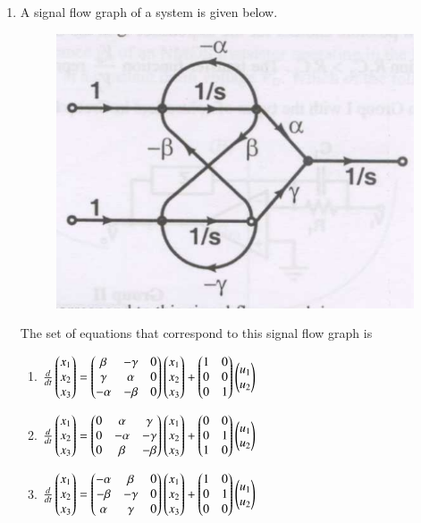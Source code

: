\documentclass[a4paper, 11pt]{article}
\begin{document}
\begin{enumerate}
    \item A signal flow graph of a system is given below.
    \begin{figure}[H]
        \centering
        \includegraphics[width=0.7\columnwidth]{q40}
        \caption*{}
        \label{fig:q40}
    \end{figure}
    The set of equations that correspond to this signal flow graph is
    \begin{enumerate}
        \item $\frac{d}{dt}\begin{pmatrix}x_1 \\ x_2 \\ x_3\end{pmatrix} = \begin{pmatrix}\beta & -\gamma & 0 \\ \gamma & \alpha & 0 \\ -\alpha & -\beta & 0\end{pmatrix}\begin{pmatrix}x_1 \\ x_2 \\ x_3\end{pmatrix} + \begin{pmatrix}1 & 0 \\ 0 & 0 \\ 0 & 1\end{pmatrix}\begin{pmatrix}u_1 \\ u_2\end{pmatrix}$
        \item $\frac{d}{dt}\begin{pmatrix}x_1 \\ x_2 \\ x_3\end{pmatrix} = \begin{pmatrix}0 & \alpha & \gamma \\ 0 & -\alpha & -\gamma \\ 0 & \beta & -\beta\end{pmatrix}\begin{pmatrix}x_1 \\ x_2 \\ x_3\end{pmatrix} + \begin{pmatrix}0 & 0 \\ 0 & 1 \\ 1 & 0\end{pmatrix}\begin{pmatrix}u_1 \\ u_2\end{pmatrix}$
        \item $\frac{d}{dt}\begin{pmatrix}x_1 \\ x_2 \\ x_3\end{pmatrix} = \begin{pmatrix}-\alpha & \beta & 0 \\ -\beta & -\gamma & 0 \\ \alpha & \gamma & 0\end{pmatrix}\begin{pmatrix}x_1 \\ x_2 \\ x_3\end{pmatrix} + \begin{pmatrix}1 & 0 \\ 0 & 1 \\ 0 & 0\end{pmatrix}\begin{pmatrix}u_1 \\ u_2\end{pmatrix}$

\end{enumerate}
\end{enumerate}
\end{document}
